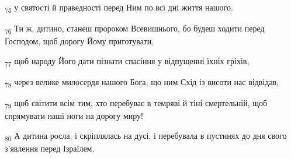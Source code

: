 \begin{tcolorbox}
\textsubscript{75} у святості й праведності перед Ним по всі дні життя нашого.
\end{tcolorbox}
\begin{tcolorbox}
\textsubscript{76} Ти ж, дитино, станеш пророком Всевишнього, бо будеш ходити перед Господом, щоб дорогу Йому приготувати,
\end{tcolorbox}
\begin{tcolorbox}
\textsubscript{77} щоб народу Його дати пізнати спасіння у відпущенні їхніх гріхів,
\end{tcolorbox}
\begin{tcolorbox}
\textsubscript{78} через велике милосердя нашого Бога, що ним Схід із висоти нас відвідав,
\end{tcolorbox}
\begin{tcolorbox}
\textsubscript{79} щоб світити всім тим, хто перебуває в темряві й тіні смертельній, щоб спрямувати наші ноги на дорогу миру!
\end{tcolorbox}
\begin{tcolorbox}
\textsubscript{80} А дитина росла, і скріплялась на дусі, і перебувала в пустинях до дня свого з'явлення перед Ізраїлем.
\end{tcolorbox}
